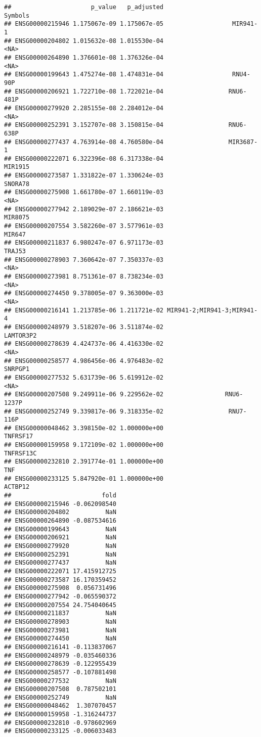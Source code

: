 \documentclass[]{article}
\begin{document}
\begin{verbatim}
##                      p_value   p_adjusted                    Symbols
## ENSG00000215946 1.175067e-09 1.175067e-05                   MIR941-1
## ENSG00000204802 1.015632e-08 1.015530e-04                       <NA>
## ENSG00000264890 1.376601e-08 1.376326e-04                       <NA>
## ENSG00000199643 1.475274e-08 1.474831e-04                   RNU4-90P
## ENSG00000206921 1.722710e-08 1.722021e-04                  RNU6-481P
## ENSG00000279920 2.285155e-08 2.284012e-04                       <NA>
## ENSG00000252391 3.152707e-08 3.150815e-04                  RNU6-638P
## ENSG00000277437 4.763914e-08 4.760580e-04                  MIR3687-1
## ENSG00000222071 6.322396e-08 6.317338e-04                    MIR1915
## ENSG00000273587 1.331822e-07 1.330624e-03                    SNORA78
## ENSG00000275908 1.661780e-07 1.660119e-03                       <NA>
## ENSG00000277942 2.189029e-07 2.186621e-03                    MIR8075
## ENSG00000207554 3.582260e-07 3.577961e-03                     MIR647
## ENSG00000211837 6.980247e-07 6.971173e-03                     TRAJ53
## ENSG00000278903 7.360642e-07 7.350337e-03                       <NA>
## ENSG00000273981 8.751361e-07 8.738234e-03                       <NA>
## ENSG00000274450 9.378005e-07 9.363000e-03                       <NA>
## ENSG00000216141 1.213785e-06 1.211721e-02 MIR941-2;MIR941-3;MIR941-4
## ENSG00000248979 3.518207e-06 3.511874e-02                  LAMTOR3P2
## ENSG00000278639 4.424737e-06 4.416330e-02                       <NA>
## ENSG00000258577 4.986456e-06 4.976483e-02                    SNRPGP1
## ENSG00000277532 5.631739e-06 5.619912e-02                       <NA>
## ENSG00000207508 9.249911e-06 9.229562e-02                 RNU6-1237P
## ENSG00000252749 9.339817e-06 9.318335e-02                  RNU7-116P
## ENSG00000048462 3.398150e-02 1.000000e+00                   TNFRSF17
## ENSG00000159958 9.172109e-02 1.000000e+00                  TNFRSF13C
## ENSG00000232810 2.391774e-01 1.000000e+00                        TNF
## ENSG00000233125 5.847920e-01 1.000000e+00                    ACTBP12
##                         fold
## ENSG00000215946 -0.062098540
## ENSG00000204802          NaN
## ENSG00000264890 -0.087534616
## ENSG00000199643          NaN
## ENSG00000206921          NaN
## ENSG00000279920          NaN
## ENSG00000252391          NaN
## ENSG00000277437          NaN
## ENSG00000222071 17.415912725
## ENSG00000273587 16.170359452
## ENSG00000275908  0.056731496
## ENSG00000277942 -0.065590372
## ENSG00000207554 24.754040645
## ENSG00000211837          NaN
## ENSG00000278903          NaN
## ENSG00000273981          NaN
## ENSG00000274450          NaN
## ENSG00000216141 -0.113837067
## ENSG00000248979 -0.035460336
## ENSG00000278639 -0.122955439
## ENSG00000258577 -0.107881498
## ENSG00000277532          NaN
## ENSG00000207508  0.787502101
## ENSG00000252749          NaN
## ENSG00000048462  1.307070457
## ENSG00000159958 -1.316244737
## ENSG00000232810 -0.978602969
## ENSG00000233125 -0.006033483
\end{verbatim}
\end{document}
